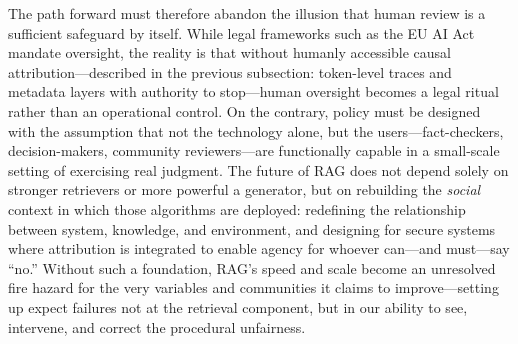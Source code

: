 \documentclass[11pt]{article}
\begin{document}
The path forward must therefore abandon the illusion that human review is a sufficient safeguard by itself. While legal frameworks such as the EU AI Act mandate oversight, the reality is that without humanly accessible causal attribution---described in the previous subsection: token-level traces and metadata layers with authority to stop---human oversight becomes a legal ritual rather than an operational control. On the contrary, policy must be designed with the assumption that not the technology alone, but the users---fact-checkers, decision-makers, community reviewers---are functionally capable in a small-scale setting of exercising real judgment. The future of RAG does not depend solely on stronger retrievers or more powerful a generator, but on rebuilding the \emph{social} context in which those algorithms are deployed: redefining the relationship between system, knowledge, and environment, and designing for secure systems where attribution is integrated to enable agency for whoever can---and must---say ``no.'' Without such a foundation, RAG's speed and scale become an unresolved fire hazard for the very variables and communities it claims to improve---setting up expect failures not at the retrieval component, but in our ability to see, intervene, and correct the procedural unfairness.
\end{document}
